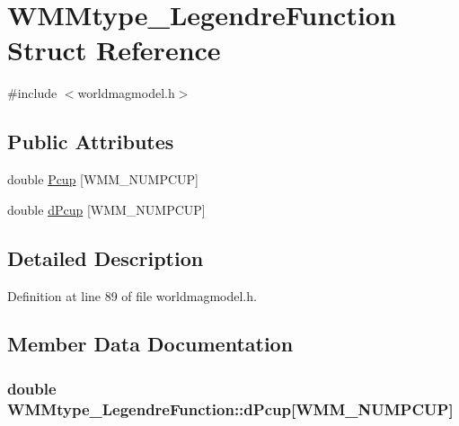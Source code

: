 \hypertarget{struct_w_m_mtype___legendre_function}{\section{\-W\-M\-Mtype\-\_\-\-Legendre\-Function \-Struct \-Reference}
\label{struct_w_m_mtype___legendre_function}
}


{\ttfamily \#include $<$worldmagmodel.\-h$>$}

\subsection*{\-Public \-Attributes}
\begin{DoxyCompactItemize}
\item 
double \hyperlink{struct_w_m_mtype___legendre_function_a5badc4162d0641c9de51a11bf49d2f71}{\-Pcup} \mbox{[}\-W\-M\-M\-\_\-\-N\-U\-M\-P\-C\-U\-P\mbox{]}
\item 
double \hyperlink{struct_w_m_mtype___legendre_function_a671f898b60683a35dfd5c622dfee1cf7}{d\-Pcup} \mbox{[}\-W\-M\-M\-\_\-\-N\-U\-M\-P\-C\-U\-P\mbox{]}
\end{DoxyCompactItemize}


\subsection{\-Detailed \-Description}


\-Definition at line 89 of file worldmagmodel.\-h.



\subsection{\-Member \-Data \-Documentation}
\hypertarget{struct_w_m_mtype___legendre_function_a671f898b60683a35dfd5c622dfee1cf7}{
\subsubsection[{d\-Pcup}]{\setlength{\rightskip}{0pt plus 5cm}double {\bf \-W\-M\-Mtype\-\_\-\-Legendre\-Function\-::d\-Pcup}\mbox{[}\-W\-M\-M\-\_\-\-N\-U\-M\-P\-C\-U\-P\mbox{]}}}\label{struct_w_m_mtype___legendre_function_a671f898b60683a35dfd5c622dfee1cf7}


